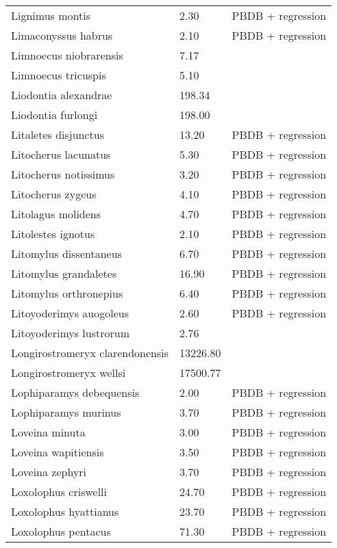 \begin{longtable}{p{} p{} p{}}
    Lignimus montis & 2.30 & PBDB + regression \\ 
    Limaconyssus habrus & 2.10 & PBDB + regression \\ 
    Limnoecus niobrarensis & 7.17 & \cite{Tomiya2013} \\ 
    Limnoecus tricuspis & 5.10 & \cite{Tomiya2013} \\ 
    Liodontia alexandrae & 198.34 & \cite{Tomiya2013} \\ 
    Liodontia furlongi & 198.00 & \cite{McKenna2011} \\ 
    Litaletes disjunctus & 13.20 & PBDB + regression \\ 
    Litocherus lacunatus & 5.30 & PBDB + regression \\ 
    Litocherus notissimus & 3.20 & PBDB + regression \\ 
    Litocherus zygeus & 4.10 & PBDB + regression \\ 
    Litolagus molidens & 4.70 & PBDB + regression \\ 
    Litolestes ignotus & 2.10 & PBDB + regression \\ 
    Litomylus dissentaneus & 6.70 & PBDB + regression \\ 
    Litomylus grandaletes & 16.90 & PBDB + regression \\ 
    Litomylus orthronepius & 6.40 & PBDB + regression \\ 
    Litoyoderimys auogoleus & 2.60 & PBDB + regression \\ 
    Litoyoderimys lustrorum & 2.76 & \cite{Rich1981} \\ 
    Longirostromeryx clarendonensis & 13226.80 & \cite{Tomiya2013} \\ 
    Longirostromeryx wellsi & 17500.77 & \cite{Tomiya2013} \\ 
    Lophiparamys debequensis & 2.00 & PBDB + regression \\ 
    Lophiparamys murinus & 3.70 & PBDB + regression \\ 
    Loveina minuta & 3.00 & PBDB + regression \\ 
    Loveina wapitiensis & 3.50 & PBDB + regression \\ 
    Loveina zephyri & 3.70 & PBDB + regression \\ 
    Loxolophus criswelli & 24.70 & PBDB + regression \\ 
    Loxolophus hyattianus & 23.70 & PBDB + regression \\ 
    Loxolophus pentacus & 71.30 & PBDB + regression \\ 

\end{longtable}
